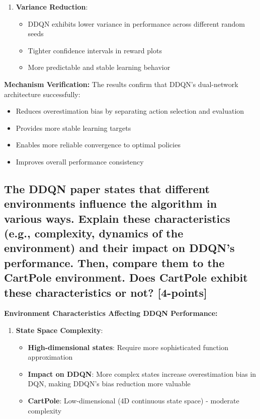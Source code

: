 \documentclass[12pt]{article}
\begin{document}
{{{\begin{enumerate}
    \item \textbf{Variance Reduction}:
    \begin{itemize}
        \item DDQN exhibits lower variance in performance across different random seeds
        \item Tighter confidence intervals in reward plots
        \item More predictable and stable learning behavior
    \end{itemize}
\end{enumerate}

\textbf{Mechanism Verification:}
The results confirm that DDQN's dual-network architecture successfully:
\begin{itemize}
    \item Reduces overestimation bias by separating action selection and evaluation
    \item Provides more stable learning targets
    \item Enables more reliable convergence to optimal policies
    \item Improves overall performance consistency
\end{itemize}

\subsection{The DDQN paper states that different environments influence the algorithm in various ways. Explain these characteristics (e.g., complexity, dynamics of the environment) and their impact on DDQN's performance. Then, compare them to the CartPole environment. Does CartPole exhibit these characteristics or not? [4-points]}

\textbf{Environment Characteristics Affecting DDQN Performance:}

\begin{enumerate}
    \item \textbf{State Space Complexity}:
    \begin{itemize}
        \item \textbf{High-dimensional states}: Require more sophisticated function approximation
        \item \textbf{Impact on DDQN}: More complex states increase overestimation bias in DQN, making DDQN's bias reduction more valuable
        \item \textbf{CartPole}: Low-dimensional (4D continuous state space) - moderate complexity
    \end{itemize}
    

\end{enumerate}}}}
\end{document}
